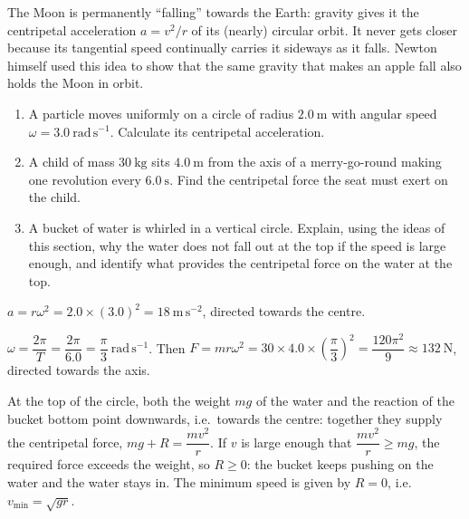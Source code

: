 \documentclass[11pt]{article}
\begin{document}
\begin{savaistu}
The Moon is permanently ``falling'' towards the Earth: gravity gives it the centripetal acceleration $a = v^{2}/r$ of its (nearly) circular orbit. It never gets closer because its tangential speed continually carries it sideways as it falls. Newton himself used this idea to show that the same gravity that makes an apple fall also holds the Moon in orbit.
\end{savaistu}

\begin{exercice}[Practice]
\begin{enumerate}
\item A particle moves uniformly on a circle of radius $2.0\ \mathrm{m}$ with angular speed $\omega = 3.0\ \mathrm{rad\,s^{-1}}$. Calculate its centripetal acceleration.
\item A child of mass $30\ \mathrm{kg}$ sits $4.0\ \mathrm{m}$ from the axis of a merry-go-round making one revolution every $6.0\ \mathrm{s}$. Find the centripetal force the seat must exert on the child.
\item A bucket of water is whirled in a vertical circle. Explain, using the ideas of this section, why the water does not fall out at the top if the speed is large enough, and identify what provides the centripetal force on the water at the top.
\end{enumerate}
\end{exercice}

\begin{corrige}[Exercise 1]
$a = r\omega^{2} = 2.0 \times (3.0)^{2} = 18\ \mathrm{m\,s^{-2}}$, directed towards the centre.
\end{corrige}

\begin{corrige}[Exercise 2]
$\omega = \dfrac{2\pi}{T} = \dfrac{2\pi}{6.0} = \dfrac{\pi}{3}\ \mathrm{rad\,s^{-1}}$. Then
$F = mr\omega^{2} = 30 \times 4.0 \times \left(\dfrac{\pi}{3}\right)^{2} = \dfrac{120\pi^{2}}{9} \approx 132\ \mathrm{N}$, directed towards the axis.
\end{corrige}

\begin{corrige}[Exercise 3]
At the top of the circle, both the weight $mg$ of the water and the reaction of the bucket bottom point downwards, i.e.\ towards the centre: together they supply the centripetal force, $mg + R = \dfrac{mv^{2}}{r}$. If $v$ is large enough that $\dfrac{mv^{2}}{r} \geq mg$, the required force exceeds the weight, so $R \geq 0$: the bucket keeps pushing on the water and the water stays in. The minimum speed is given by $R = 0$, i.e.\ $v_{\min} = \sqrt{gr}$.
\end{corrige}
\end{document}
